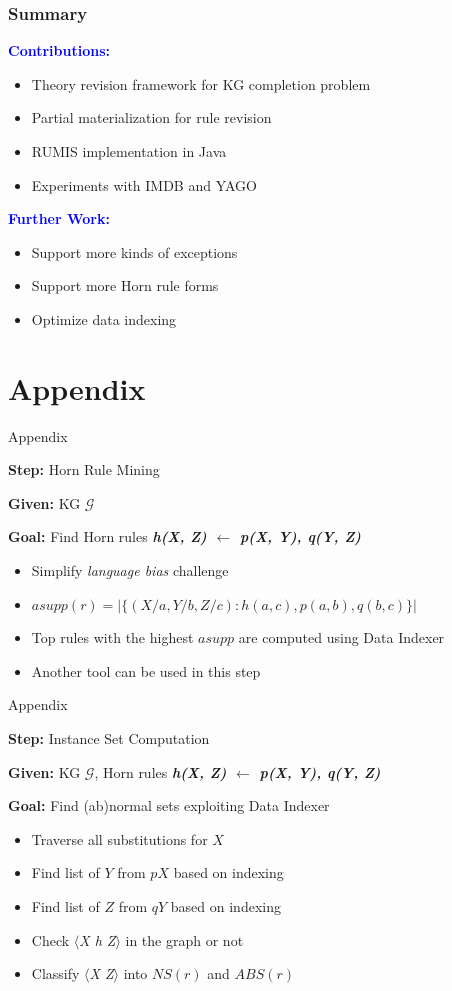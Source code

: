 \documentclass{beamer}
\newcommand{\bl}[1]{\textcolor{blue}{#1}}
\def\cG{\ensuremath{\mathcal{G}}}
\begin{document}
\begin{frame} \frametitle{Summary}
\textbf{\bl{Contributions:}}
\begin{itemize}
\item Theory revision framework for KG completion problem
\item Partial materialization for rule revision
\item RUMIS implementation in Java
\item Experiments with IMDB and YAGO
\end{itemize}
\bigskip
\bigskip

\textbf{\bl{Further Work:}}
\begin{itemize}
\item Support more kinds of exceptions
\item Support more Horn rule forms
\item Optimize data indexing
\end{itemize}
\end{frame}

\section{Appendix}
\begin{frame}{Appendix}

\textbf{Step:} Horn Rule Mining~\cite{rumis}
\smallskip

\textbf{Given:} KG $\cG$
\smallskip

\textbf{Goal:} Find Horn rules \textit{\textbf{h(X, Z) $\leftarrow$ p(X, Y), q(Y, Z)}}
\smallskip
\begin{itemize}
	\item Simplify \textit{language bias} challenge
	\item $asupp(r)=|\{(X/a, Y/b, Z/c):h(a, c),p(a, b),q(b, c)\}|$
	\item Top rules with the highest $asupp$ are computed using Data Indexer
	\item Another tool can be used in this step
\end{itemize}

\end{frame}

\begin{frame}{Appendix}

\textbf{Step:} Instance Set Computation
\smallskip

\textbf{Given:} KG $\cG$, Horn rules \textit{\textbf{h(X, Z) $\leftarrow$ p(X, Y), q(Y, Z)}}

\smallskip
\textbf{Goal:} Find (ab)normal sets exploiting Data Indexer
\begin{itemize}
	\item Traverse all substitutions for $X$
	\item Find list of $Y$ from $pX$ based on indexing
	\item Find list of $Z$ from $qY$ based on indexing
	\item Check \textit{$\langle$X h Z$\rangle$} in the graph or not
	\item Classify \textit{$\langle$X Z$\rangle$} into $NS(r)$ and $ABS(r)$
\end{itemize}

\end{frame}
\end{document}
